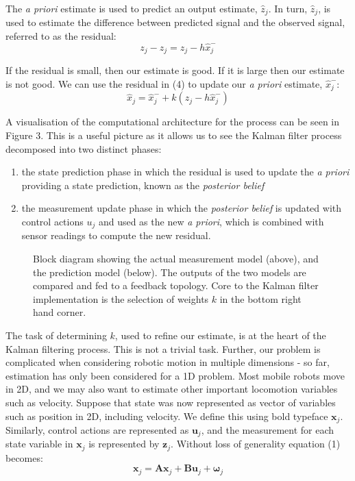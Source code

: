 \documentclass[a4paper]{article}
\begin{document}
The \textit{a priori} estimate is used to predict an output estimate,  $\hat{z}_j$. In turn, $\hat{z}_j$, is used to estimate the difference between predicted signal and the observed signal, referred to as the residual:
\begin{equation}
z_j - \hat{z}_j = z_j - h \hat{x}^-_j
\end{equation}

If the residual is small, then our estimate is good. If it is large then our estimate is not good. We can use the residual in (4) to update our \textit{a priori} estimate, $\hat{x}^-_j$:
\begin{equation}
\hat{x}_j = \hat{x}^-_j + k (z_j - h \hat{x}^-_j)
\end{equation}

A visualisation of the computational architecture for the process can be seen in Figure 3. This is a useful picture as it allows us to see the Kalman filter process decomposed into two distinct phases:
\begin{enumerate}
\item the state prediction phase in which the residual is used to update the \textit{a priori} providing a state prediction, known as the \textit{posterior belief}
\item the measurement update phase in which the \textit{posterior belief} is updated with control actions $u_j$ and used as the new \textit{a priori}, which is combined with sensor readings to compute the new residual.
\end{enumerate}

\begin{figure}[h]
\centering

\caption{Block diagram showing the actual measurement model (above), and the prediction model (below). The outputs of the two models are compared and fed to a feedback topology. Core to the Kalman filter implementation is the selection of weights $k$ in the bottom right hand corner.}
\end{figure}

The task of determining $k$, used to refine our estimate, is at the heart of the Kalman filtering process. This is not a trivial task. Further, our problem is complicated when considering robotic motion in multiple dimensions - so far, estimation has only been considered for a 1D problem. Most mobile robots move in 2D, and we may also want to estimate other important locomotion variables such as velocity. Suppose that state was now represented as vector of variables such as position in 2D, including velocity. We define this using bold typeface $\mathbf{x}_j$. Similarly, control actions are represented as $\mathbf{u}_j$, and the measurement for each state variable in $\mathbf{x}_j$ is represented by $\mathbf{z}_j$. Without loss of generality equation (1) becomes:
\begin{equation}
\mathbf{x}_j = \mathbf{A} \mathbf{x}_j + \mathbf{B} \mathbf{u}_j + \boldsymbol{\omega}_j
\end{equation}
\end{document}
